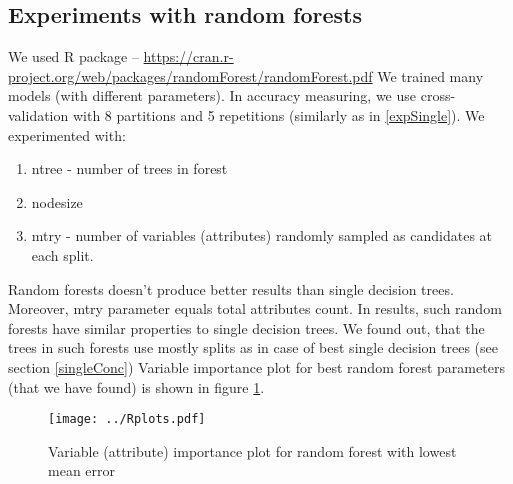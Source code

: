 \documentclass[a4paper]{article}
\begin{document}
\begin{multicols}{2}
\section{Experiments with random forests}
We used R package -- \url{https://cran.r-project.org/web/packages/randomForest/randomForest.pdf}
We trained many models (with different parameters).
In accuracy measuring, we use cross-validation with 8 partitions
and 5 repetitions (similarly as in \ref{expSingle}).
We experimented with:
\begin{enumerate}
    \item ntree - number of trees in forest
    \item nodesize
    \item mtry - number of variables (attributes) randomly sampled as candidates at each split.
\end{enumerate}
Random forests doesn't produce better results than single decision trees.
Moreover, mtry parameter equals total attributes count.
In results, such random forests have similar properties to single decision trees.
We found out, that the trees in such forests use mostly splits as
in case of best single decision trees (see section \ref{singleConc})
Variable importance plot for best random forest parameters (that we have found)
is shown in figure \ref{fig:importance}.

\begin{figure}[H]
    \centering
    \texttt{[image: ../Rplots.pdf]}
    \label{fig:importance}
    \caption[]{Variable (attribute) importance plot for random forest with lowest mean error}
\end{figure}


% 
% 

\end{multicols}
\end{document}
